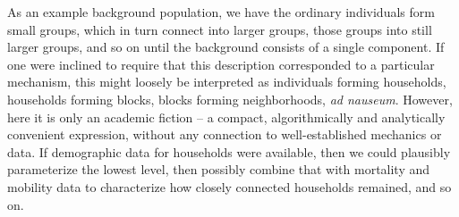 \documentclass{article}
\begin{document}


As an example background population, we have the ordinary individuals form small groups, which in turn connect into larger groups, those groups into still larger groups, and so on until the background consists of a single component.  If one were inclined to require that this description corresponded to a particular mechanism, this might loosely be interpreted as individuals forming households, households forming blocks, blocks forming neighborhoods, {\em ad nauseum}.  However, here it is only an academic fiction -- a compact, algorithmically and analytically convenient expression, without any connection to well-established mechanics or data.  If demographic data for households were available, then we could plausibly parameterize the lowest level, then possibly combine that with mortality and mobility data to characterize how closely connected households remained, and so on.
\end{document}
